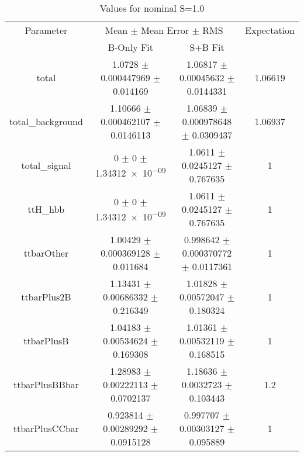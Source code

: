\begin{table}
\centering
\caption{Values for nominal S=1.0}
\begin{tabular}{cccc}
\toprule
Parameter & \multicolumn{2}{c}{Mean $\pm$ Mean Error $\pm$ RMS} & Expectation\\
 & B-Only Fit & S+B Fit & \\
\midrule
total & \num{1.0728} $\pm$ \num{0.000447969} $\pm$ \num{0.014169} & \num{1.06817} $\pm$ \num{0.00045632} $\pm$ \num{0.0144331} & \num{1.06619}\\
total\_background & \num{1.10666} $\pm$ \num{0.000462107} $\pm$ \num{0.0146113} & \num{1.06839} $\pm$ \num{0.000978648} $\pm$ \num{0.0309437} & \num{1.06937}\\
total\_signal & \num{0} $\pm$ \num{0} $\pm$ \num{1.34312e-09} & \num{1.0611} $\pm$ \num{0.0245127} $\pm$ \num{0.767635} & \num{1}\\
ttH\_hbb & \num{0} $\pm$ \num{0} $\pm$ \num{1.34312e-09} & \num{1.0611} $\pm$ \num{0.0245127} $\pm$ \num{0.767635} & \num{1}\\
ttbarOther & \num{1.00429} $\pm$ \num{0.000369128} $\pm$ \num{0.011684} & \num{0.998642} $\pm$ \num{0.000370772} $\pm$ \num{0.0117361} & \num{1}\\
ttbarPlus2B & \num{1.13431} $\pm$ \num{0.00686332} $\pm$ \num{0.216349} & \num{1.01828} $\pm$ \num{0.00572047} $\pm$ \num{0.180324} & \num{1}\\
ttbarPlusB & \num{1.04183} $\pm$ \num{0.00534624} $\pm$ \num{0.169308} & \num{1.01361} $\pm$ \num{0.00532119} $\pm$ \num{0.168515} & \num{1}\\
ttbarPlusBBbar & \num{1.28983} $\pm$ \num{0.00222113} $\pm$ \num{0.0702137} & \num{1.18636} $\pm$ \num{0.0032723} $\pm$ \num{0.103443} & \num{1.2}\\
ttbarPlusCCbar & \num{0.923814} $\pm$ \num{0.00289292} $\pm$ \num{0.0915128} & \num{0.997707} $\pm$ \num{0.00303127} $\pm$ \num{0.095889} & \num{1}\\
\bottomrule
\end{tabular}
\end{table}